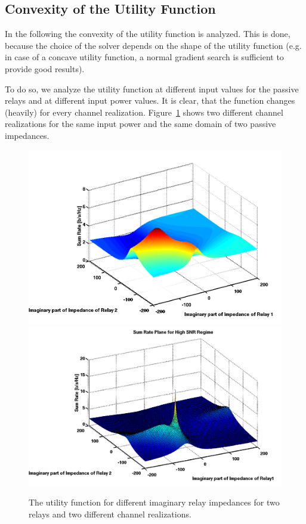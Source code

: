\subsection{Convexity of the Utility Function}
\label{sec:}

In the following the convexity of the utility function is analyzed.
This is done, because the choice of the solver depends on the shape of the utility function (e.g. in case of a concave utility function, a normal gradient search is sufficient to provide good results).

To do so, we analyze the utility function at different input values for the passive relays and at different input power values.
It is clear, that the function changes (heavily) for every channel realization.
Figure~\ref{fig:convex_3} shows two different channel realizations for the same input power and the same domain of two passive impedances.

\begin{figure}
  \includegraphics[width=\linewidth]{images/convex_1.png}
   \label{fig:convex_1}
\endminipage%
{}
  \includegraphics[width=\linewidth]{images/convex_2.png}
   \label{fig:convex_2}
\endminipage\hfill
\caption{The utility function for different imaginary relay impedances for two relays and two different channel realizations.}
   \label{fig:convex_3}
\end{figure}


